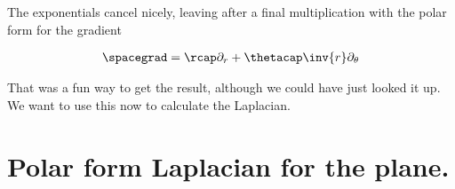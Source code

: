 The exponentials cancel nicely, leaving after a final multiplication with the polar form for the gradient

\begin{align}\label{eqn:divGradCurLap:10}
\spacegrad = \rcap \partial_r + \thetacap \inv{r} \partial_\theta
\end{align}

That was a fun way to get the result, although we could have just looked it up.  We want to use this now to calculate the Laplacian.

\section{Polar form Laplacian for the plane.}

\EndArticle
